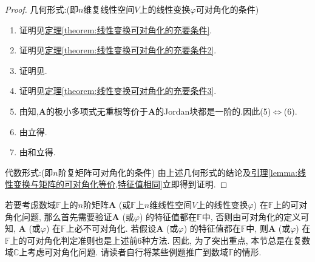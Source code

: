 \documentclass[../../main.tex]{subfiles}%
\begin{document}
\begin{proof}

{\heiti 几何形式:}(即\(n\)维复线性空间\(V\)上的线性变换\(\varphi\)可对角化的条件)
\begin{enumerate}[(1)]
\item 证明见\hyperref[theorem:线性变换可对角化的充要条件]{定理\ref{theorem:线性变换可对角化的充要条件}}.

\item 证明见\hyperref[theorem:线性变换可对角化的充要条件2]{定理\ref{theorem:线性变换可对角化的充要条件2}}.

\item 证明见.

\item 证明见\hyperref[theorem:线性变换可对角化的充要条件3]{定理\ref{theorem:线性变换可对角化的充要条件3}}.

\item 由知,$\boldsymbol{A}$的极小多项式无重根等价于$\boldsymbol{A}$的Jordan块都是一阶的.因此(5)$\iff$(6).

\item 由立得.

\item 由和立得.
\end{enumerate}
{\heiti 代数形式:}(即\(n\)阶复矩阵可对角化的条件)
由上述几何形式的结论及\hyperref[lemma:线性变换与矩阵的可对角化等价,特征值相同]{引理\ref{lemma:线性变换与矩阵的可对角化等价,特征值相同}}立即得到证明.

\end{proof}
\begin{remark}
若要考虑数域\(\mathbb{F}\)上的\(n\)阶矩阵\(\boldsymbol{A}\) (或\(\mathbb{F}\)上\(n\)维线性空间\(V\)上的线性变换\(\varphi\)) 在\(\mathbb{F}\)上的可对角化问题, 那么首先需要验证\(\boldsymbol{A}\) (或\(\varphi\)) 的特征值都在\(\mathbb{F}\)中, 否则由可对角化的定义可知, \(\boldsymbol{A}\) (或\(\varphi\)) 在\(\mathbb{F}\)上必不可对角化. 若假设\(\boldsymbol{A}\) (或\(\varphi\)) 的特征值都在\(\mathbb{F}\)中, 则\(\boldsymbol{A}\) (或\(\varphi\)) 在\(\mathbb{F}\)上的可对角化判定准则也是上述前\(6\)种方法. 因此, 为了突出重点, 本节总是在复数域\(\mathbb{C}\)上考虑可对角化问题. 请读者自行将某些例题推广到数域\(\mathbb{F}\)的情形. 
\end{remark}
\end{document}
